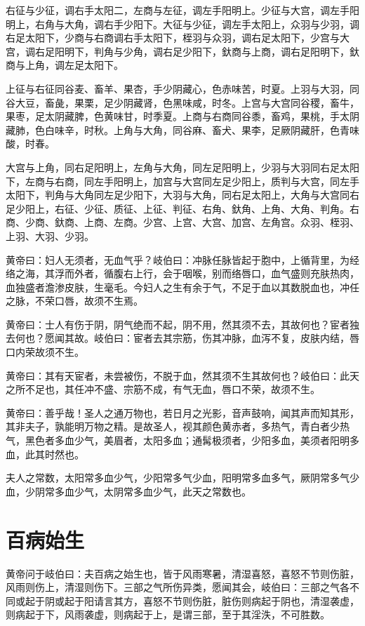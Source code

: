\documentclass[a4paper,12pt,UTF8,twoside]{ctexbook}
\begin{document}
	右征与少征，调右手太阳二，左商与左征，调左手阳明上。少征与大宫，调左手阳明上，右角与大角，调右手少阳下。大征与少征，调左手太阳上，众羽与少羽，调右足太阳下，少商与右商调右手太阳下，桎羽与众羽，调右足太阳下，少宫与大宫，调右足阳明下，判角与少角，调右足少阳下，釱商与上商，调右足阳明下，釱商与上角，调左足太阳下。
	
	上征与右征同谷麦、畜羊、果杏，手少阴藏心，色赤味苦，时夏。上羽与大羽，同谷大豆，畜彘，果栗，足少阴藏肾，色黑味咸，时冬。上宫与大宫同谷稷，畜牛，果枣，足太阴藏脾，色黄味甘，时季夏。上商与右商同谷黍，畜鸡，果桃，手太阴藏肺，色白味辛，时秋。上角与大角，同谷麻、畜犬、果李，足厥阴藏肝，色青味酸，时春。
	
	大宫与上角，同右足阳明上，左角与大角，同左足阳明上，少羽与大羽同右足太阳下，左商与右商，同左手阳明上，加宫与大宫同左足少阳上，质判与大宫，同左手太阳下，判角与大角同左足少阳下，大羽与大角，同右足太阳上，大角与大宫同右足少阳上，右征、少征、质征、上征、判征、右角、釱角、上角、大角、判角。右商、少商、釱商、上商、左商。少宫、上宫、大宫、加宫、左角宫。众羽、桎羽、上羽、大羽、少羽。
	
	黄帝曰：妇人无须者，无血气乎？岐伯曰：冲脉任脉皆起于胞中，上循背里，为经络之海，其浮而外者，循腹右上行，会于咽喉，别而络唇口，血气盛则充肤热肉，血独盛者澹渗皮肤，生毫毛。今妇人之生有余于气，不足于血以其数脱血也，冲任之脉，不荣口唇，故须不生焉。
	
	黄帝曰：士人有伤于阴，阴气绝而不起，阴不用，然其须不去，其故何也？宦者独去何也？愿闻其故。岐伯曰：宦者去其宗筋，伤其冲脉，血泻不复，皮肤内结，唇口内荣故须不生。
	
	黄帝曰：其有天宦者，未尝被伤，不脱于血，然其须不生其故何也？岐伯曰：此天之所不足也，其任冲不盛、宗筋不成，有气无血，唇口不荣，故须不生。
	
	黄帝曰：善乎哉！圣人之通万物也，若日月之光影，音声鼓响，闻其声而知其形，其非夫子，孰能明万物之精。是故圣人，视其颜色黄赤者，多热气，青白者少热气，黑色者多血少气，美眉者，太阳多血；通髯极须者，少阳多血，美须者阳明多血，此其时然也。
	
	夫人之常数，太阳常多血少气，少阳常多气少血，阳明常多血多气，厥阴常多气少血，少阴常多血少气，太阴常多血少气，此天之常数也。
	
	\chapter{百病始生}
	
	黄帝问于岐伯曰：夫百病之始生也，皆于风雨寒暑，清湿喜怒，喜怒不节则伤脏，风雨则伤上，清湿则伤下。三部之气所伤异类，愿闻其会，岐伯曰：三部之气各不同或起于阴或起于阳请言其方，喜怒不节则伤脏，脏伤则病起于阴也，清湿袭虚，则病起于下，风雨袭虚，则病起于上，是谓三部，至于其淫泆，不可胜数。
	
\end{document}
